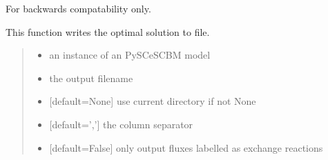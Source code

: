 \documentclass[letterpaper,12pt,english]{sphinxmanual}
\begin{document}
\begin{fulllineitems}

\pysigstartsignatures
\pysiglinewithargsret
{}
{\sphinxparamcomma {}\sphinxparamcomma {}\sphinxparamcomma {}\sphinxparamcomma {}}
{}
\pysigstopsignatures
\sphinxAtStartPar
For backwards compatability only.

\end{fulllineitems}



\begin{fulllineitems}

\pysigstartsignatures
\pysiglinewithargsret
{}
{\sphinxparamcomma {}\sphinxparamcomma {}\sphinxparamcomma {}\sphinxparamcomma {}}
{}
\pysigstopsignatures
\sphinxAtStartPar
This function writes the optimal solution to file.
\begin{quote}\begin{description}
\begin{itemize}
\item {} 
\sphinxAtStartPar
{} \textendash{} an instance of an PySCeSCBM model

\item {} 
\sphinxAtStartPar
{} \textendash{} the output filename

\item {} 
\sphinxAtStartPar
{} \textendash{} {[}default=None{]} use current directory if not None

\item {} 
\sphinxAtStartPar
{} \textendash{} {[}default=’,’{]} the column separator

\item {} 
\sphinxAtStartPar
{} \textendash{} {[}default=False{]} only output fluxes labelled as exchange reactions

\end{itemize}

\end{description}\end{quote}

\end{fulllineitems}
\end{document}
